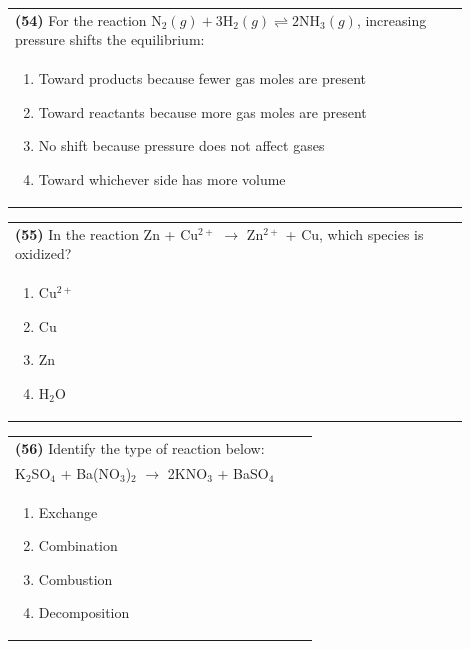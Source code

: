 \documentclass{article}
\begin{document}
\noindent\begin{tabular}{|p{0.9\linewidth}|}
\hline
\textbf{(54)} For the reaction $\text{N}_2(g) + 3\text{H}_2(g) \rightleftharpoons 2\text{NH}_3(g)$, increasing pressure shifts the equilibrium: \\[0.2cm]
\begin{minipage}[t]{0.85\linewidth}
\begin{enumerate}[label=\alph*.]
\item Toward products because fewer gas moles are present
\item Toward reactants because more gas moles are present
\item No shift because pressure does not affect gases
\item Toward whichever side has more volume
\end{enumerate}
\end{minipage}\\[0.2cm]
\hline
\end{tabular}

\noindent\begin{tabular}{|p{0.9\linewidth}|}
\hline
\textbf{(55)} In the reaction Zn + Cu$^{2+}$ $\rightarrow$ Zn$^{2+}$ + Cu, which species is oxidized?\\[0.2cm]
\begin{minipage}[t]{0.85\linewidth}
\begin{enumerate}[label=\alph*.]
\item Cu$^{2+}$
\item Cu
\item Zn
\item H$_2$O
\end{enumerate}
\end{minipage}\\[0.2cm]
\hline
\end{tabular}

\noindent\begin{tabular}{|p{0.9\linewidth}|}
\hline
\textbf{(56)} Identify the type of reaction below:\\[0.2cm]
K$_2$SO$_4$ + Ba(NO$_3$)$_2$ $\rightarrow$ 2KNO$_3$ + BaSO$_4$\\[0.2cm]
\begin{minipage}[t]{0.85\linewidth}
\begin{enumerate}[label=\alph*.]
\item Exchange
\item Combination
\item Combustion
\item Decomposition
\end{enumerate}
\end{minipage}\\[0.2cm]
\hline
\end{tabular}
\newpage
\end{document}
